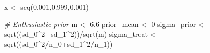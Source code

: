 \documentclass[
]{book}
\newenvironment{Shaded}{\begin{snugshade}}{\end{snugshade}}
\newcommand{\CommentTok}[1]{\textcolor[rgb]{0.56,0.35,0.01}{\textit{#1}}}
\newcommand{\DecValTok}[1]{\textcolor[rgb]{0.00,0.00,0.81}{#1}}
\newcommand{\FloatTok}[1]{\textcolor[rgb]{0.00,0.00,0.81}{#1}}
\newcommand{\FunctionTok}[1]{\textcolor[rgb]{0.00,0.00,0.00}{#1}}
\newcommand{\NormalTok}[1]{#1}
\newcommand{\OtherTok}[1]{\textcolor[rgb]{0.56,0.35,0.01}{#1}}
\newcommand{\SpecialCharTok}[1]{\textcolor[rgb]{0.00,0.00,0.00}{#1}}
\begin{document}
\begin{Shaded}
\begin{Highlighting}[]
\NormalTok{x }\OtherTok{\textless{}{-}} \FunctionTok{seq}\NormalTok{(}\FloatTok{0.001}\NormalTok{,}\FloatTok{0.999}\NormalTok{,}\FloatTok{0.001}\NormalTok{)}

\CommentTok{\# Enthusiastic prior}
\NormalTok{m }\OtherTok{\textless{}{-}} \FloatTok{6.6}
\NormalTok{prior\_mean }\OtherTok{\textless{}{-}} \DecValTok{0}
\NormalTok{sigma\_prior }\OtherTok{\textless{}{-}} \FunctionTok{sqrt}\NormalTok{((sd\_0}\SpecialCharTok{\^{}}\DecValTok{2}\SpecialCharTok{+}\NormalTok{sd\_1}\SpecialCharTok{\^{}}\DecValTok{2}\NormalTok{))}\SpecialCharTok{/}\FunctionTok{sqrt}\NormalTok{(m)}
\NormalTok{sigma\_treat }\OtherTok{\textless{}{-}} \FunctionTok{sqrt}\NormalTok{((sd\_0}\SpecialCharTok{\^{}}\DecValTok{2}\SpecialCharTok{/}\NormalTok{n\_0}\SpecialCharTok{+}\NormalTok{sd\_1}\SpecialCharTok{\^{}}\DecValTok{2}\SpecialCharTok{/}\NormalTok{n\_1))}


\end{Highlighting}
\end{Shaded}
\end{document}
